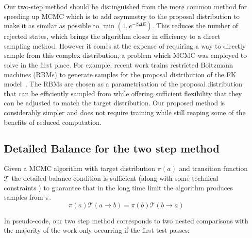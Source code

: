 Our two-step method should be distinguished from the more common method for speeding up MCMC which is to add asymmetry to the proposal distribution to make it as similar as possible to \(\min\left(1, e^{-\beta \Delta E}\right)\). This reduces the number of rejected states, which brings the algorithm closer in efficiency to a direct sampling method. However it comes at the expense of requiring a way to directly sample from this complex distribution, a problem which MCMC was employed to solve in the first place. For example, recent work trains restricted Boltzmann machines (RBMs) to generate samples for the proposal distribution of the FK model~\autocite{huangAcceleratedMonteCarlo2017}. The RBMs are chosen as a parametrisation of the proposal distribution that can be efficiently sampled from while offering sufficient flexibility that they can be adjusted to match the target distribution. Our proposed method is considerably simpler and does not require training while still reaping some of the benefits of reduced computation.

\hypertarget{detailed-balance-for-the-two-step-method}{%
\subsection{Detailed Balance for the two step method}\label{detailed-balance-for-the-two-step-method}}

Given a MCMC algorithm with target distribution \(\pi(a)\) and transition function \(\mathcal{T}\) the detailed balance condition is sufficient (along with some technical constraints \autocite{wolffMonteCarloErrors2004}) to guarantee that in the long time limit the algorithm produces samples from \(\pi\). \[\pi(a)\mathcal{T}(a \to b) = \pi(b)\mathcal{T}(b \to a)\]

In pseudo-code, our two step method corresponds to two nested comparisons with the majority of the work only occurring if the first test passes:

